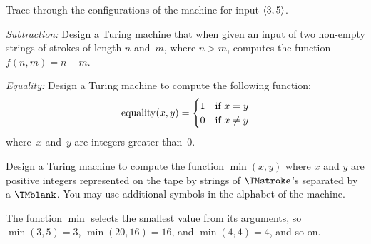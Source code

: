 \documentclass[../../../include/open-logic-section]{subfiles}
\begin{document}
\begin{prob}
Trace through the configurations of the machine for input $\langle 3,5 \rangle$.
\end{prob}

\begin{prob}
\emph{Subtraction:} Design a Turing machine that when given an input
of two non-empty strings of strokes of length $n$ and~$m$, where $n >
m$, computes the function $f(n,m) = n - m$.
\end{prob}

\begin{prob}
\emph{Equality:} Design a Turing machine to compute the following function:
\[
\fn{equality}(x,y) = 
\begin{cases}
  \text{1} & \text{if~$x = y$} \\
  \text{0} & \text{if~$x \neq y$}
\end{cases}
\]
where~$x$ and~$y$ are integers greater than~$0$.
\end{prob}

\begin{prob}
Design a Turing machine to compute the function $\min(x,y)$ where $x$
and $y$ are positive integers represented on the tape by strings of
$\TMstroke$'s separated by a $\TMblank$. You may use additional
symbols in the alphabet of the machine.

The function $\min$ selects the smallest value from its arguments, so
$\min(3,5)=3$, $\min(20,16)=16$, and $\min(4,4)=4$, and so on.
\end{prob}
\end{document}
